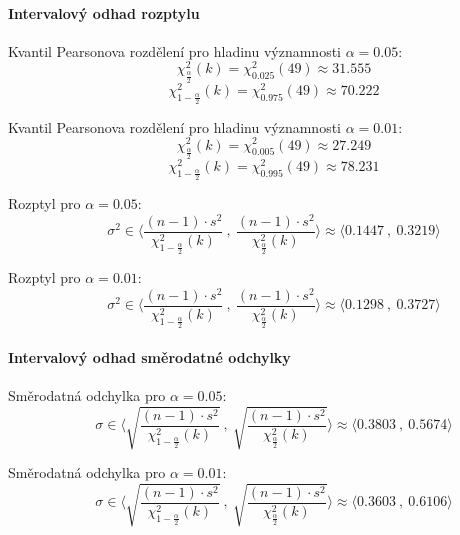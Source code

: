 \paragraph*{Intervalový odhad rozptylu}

\begin{compactitem}
    \item Kvantil Pearsonova rozdělení pro hladinu významnosti ${\displaystyle \alpha = 0.05}$:
    $${\displaystyle \qquad \chi_{\frac{\alpha}{2}}^2(k) = \chi_{0.025}^2(49) \approx 31.555}$$
    $${\displaystyle \qquad \chi_{1 - \frac{\alpha}{2}}^2(k) = \chi_{0.975}^2(49) \approx  70.222}$$

    \item Kvantil Pearsonova rozdělení pro hladinu významnosti ${\displaystyle \alpha = 0.01}$:
    $${\displaystyle \qquad \chi_{\frac{\alpha}{2}}^2(k) = \chi_{0.005}^2(49) \approx 27.249}$$
    $${\displaystyle \qquad \chi_{1 - \frac{\alpha}{2}}^2(k) = \chi_{0.995}^2(49) \approx  78.231}$$

    \item Rozptyl pro ${\displaystyle \alpha = 0.05 :}$
    $${\displaystyle \qquad \sigma^2 \in \bigg\langle \frac{(n - 1) \cdot s^2}{\chi_{1 - \frac{\alpha}{2}}^2(k)} ~,~ \frac{(n - 1) \cdot s^2}{\chi_{\frac{\alpha}{2}}^2(k)} \bigg\rangle \approx \bigg\langle 0.1447 ~,~ 0.3219 \bigg\rangle}$$

    \item Rozptyl pro ${\displaystyle \alpha = 0.01 :}$
    $${\displaystyle \qquad \sigma^2 \in \bigg\langle \frac{(n - 1) \cdot s^2}{\chi_{1 - \frac{\alpha}{2}}^2(k)} ~,~ \frac{(n - 1) \cdot s^2}{\chi_{\frac{\alpha}{2}}^2(k)} \bigg\rangle \approx \bigg\langle 0.1298 ~,~ 0.3727 \bigg\rangle}$$
\end{compactitem}

\paragraph*{Intervalový odhad směrodatné odchylky}

\begin{compactitem}
    \item Směrodatná odchylka pro ${\displaystyle \alpha = 0.05 :}$
    $${\displaystyle \qquad \sigma \in \bigg\langle \sqrt{\frac{(n - 1) \cdot s^2}{\chi_{1 - \frac{\alpha}{2}}^2(k)}} ~,~ \sqrt{\frac{(n - 1) \cdot s^2}{\chi_{\frac{\alpha}{2}}^2(k)}} \bigg\rangle \approx \bigg\langle 0.3803 ~,~ 0.5674 \bigg\rangle}$$

    \item Směrodatná odchylka pro ${\displaystyle \alpha = 0.01 :}$
    $${\displaystyle \qquad \sigma \in \bigg\langle \sqrt{\frac{(n - 1) \cdot s^2}{\chi_{1 - \frac{\alpha}{2}}^2(k)}} ~,~ \sqrt{\frac{(n - 1) \cdot s^2}{\chi_{\frac{\alpha}{2}}^2(k)}} \bigg\rangle \approx \bigg\langle 0.3603 ~,~ 0.6106 \bigg\rangle}$$
\end{compactitem}

